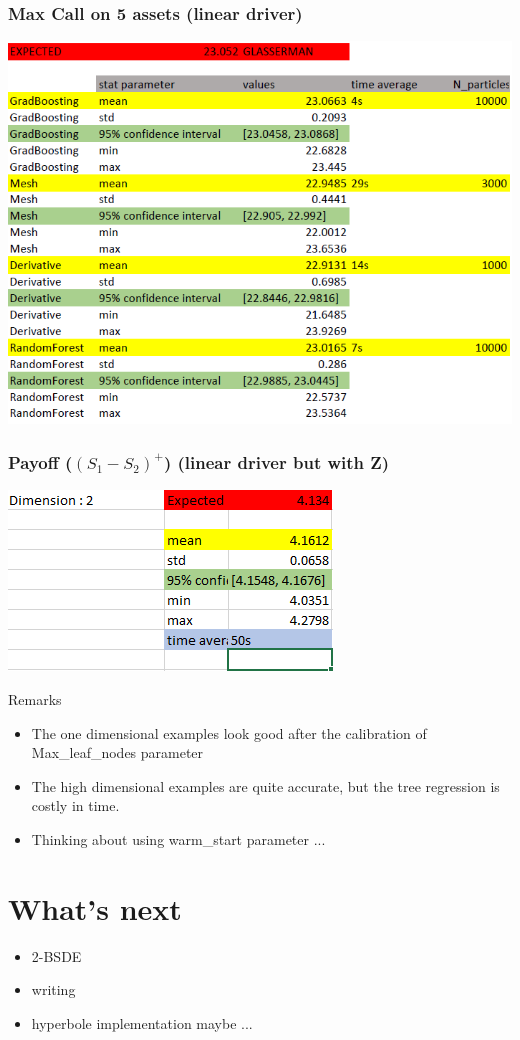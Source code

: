 \documentclass[10pt]{beamer}
\begin{document}
\begin{frame}
	\frametitle{Max Call on 5 assets (linear driver)}
	\centering
	\includegraphics[scale=0.4]{max_call_5d.png}
\end{frame}

\begin{frame}
	\frametitle{Payoff ($(S_1 - S_2)^+$) (linear driver but with Z)}
	\centering
	\includegraphics[scale=0.7]{spread_correlated.png}
\end{frame}

\begin{frame}{Remarks}
	\begin{itemize}
		\item The one dimensional examples look good after the calibration of Max\_leaf\_nodes parameter 
		\item The high dimensional examples are quite accurate, but the tree regression is costly in time. 
		\item Thinking about using warm\_start parameter ...
	\end{itemize}
\end{frame}

\section{What's next}

\begin{frame}
	\begin{itemize}
		\item 2-BSDE 
		\item writing
		\item hyperbole implementation maybe ...
	\end{itemize}
\end{frame}
 
\end{document}
